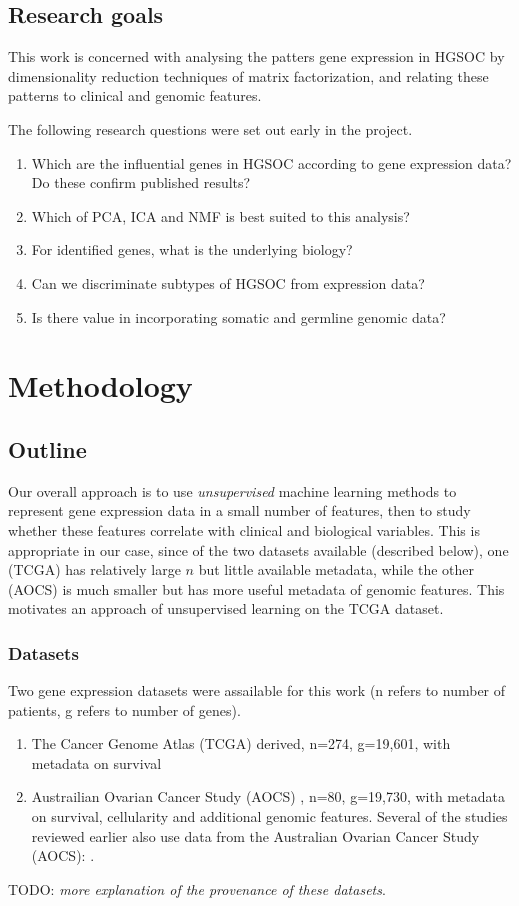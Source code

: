 \documentclass[draft, tikz, 12pt,a4paper,oneside,fleqn]{article}
\begin{document}
\subsection{Research goals}
This work is concerned with analysing the patters gene expression in HGSOC by dimensionality reduction techniques of matrix factorization, and relating these patterns to clinical and genomic features.

The following research questions were set out early in the project. 
\begin{enumerate}
\item Which are the influential genes in HGSOC according to gene expression data?   Do these confirm published results?
\item Which of PCA, ICA and NMF is best suited to this analysis?
\item For identified genes, what is the underlying biology?
\item Can we discriminate subtypes of HGSOC from expression data?
\item Is there value in incorporating somatic and germline genomic data?
\end{enumerate}


\section{Methodology}

\subsection{Outline}

Our overall approach is to use \emph{unsupervised} machine learning methods to represent gene expression data in a small number of features, then to study whether these features correlate with clinical and biological variables.  This is appropriate in our case, since of the two datasets available (described below), one (TCGA) has relatively large $n$ but little available metadata, while the other (AOCS) is much smaller but has more useful metadata of genomic features.   This motivates an approach of unsupervised learning on the TCGA dataset. 

\subsubsection{Datasets}
Two gene expression datasets were assailable for this work (n refers to number of patients, g refers to number of genes).
\begin{enumerate}
\item The Cancer Genome Atlas (TCGA) derived, n=274, g=19,601, with metadata on survival
\item Austrailian Ovarian Cancer Study (AOCS) \cite{Patch2015}, n=80, g=19,730, with metadata on survival, cellularity and additional genomic features. Several of the studies reviewed earlier also use data from the Australian Ovarian Cancer Study (AOCS): \cite{Patch2015,Ewing2020,Cuello2018,Au-Yeung2014}.
\end{enumerate}
TODO: \emph{more explanation of the provenance of these datasets}.
\end{document}
